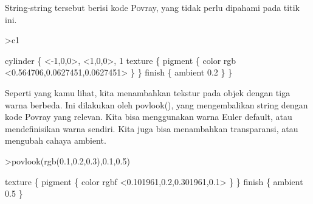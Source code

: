 \documentclass[a4paper,10pt]{article}
\begin{document}
\begin{eulernotebook}
\begin{eulercomment}
\begin{eulercomment}
\begin{eulercomment}
String-string tersebut berisi kode Povray, yang tidak perlu dipahami
pada titik ini.
\end{eulercomment}
\begin{eulerprompt}
>c1
\end{eulerprompt}
\begin{euleroutput}
  cylinder \{ <-1,0,0>, <1,0,0>, 1
   texture \{ pigment \{ color rgb <0.564706,0.0627451,0.0627451> \}  \} 
   finish \{ ambient 0.2 \} 
   \}
\end{euleroutput}
\begin{eulercomment}
Seperti yang kamu lihat, kita menambahkan tekstur pada objek dengan
tiga warna berbeda. Ini dilakukan oleh povlook(), yang mengembalikan
string dengan kode Povray yang relevan. Kita bisa menggunakan warna
Euler default, atau mendefinisikan warna sendiri. Kita juga bisa
menambahkan transparansi, atau mengubah cahaya ambient.
\end{eulercomment}
\begin{eulerprompt}
>povlook(rgb(0.1,0.2,0.3),0.1,0.5)
\end{eulerprompt}
\begin{euleroutput}
   texture \{ pigment \{ color rgbf <0.101961,0.2,0.301961,0.1> \}  \} 
   finish \{ ambient 0.5 \} 
  

\end{euleroutput}
\end{eulercomment}
\end{eulercomment}
\end{eulernotebook}
\end{document}
